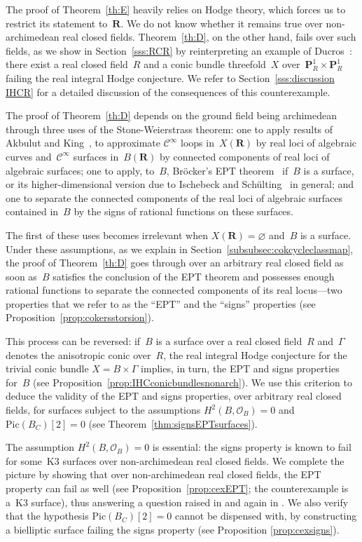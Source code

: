 \documentclass[JEP,XML,SOM,Unicode]{cedram}
\theoremstyle{plain}
\theoremstyle{definition}
\numberwithin{equation}{section}
\newcommand{\sO}{{\mathscr O}}
\renewcommand{\P}{{\mathbf P}}
\newcommand{\R}{{\mathbf R}}
\newcommand{\Pic}{\mathrm{Pic}}
\renewcommand{\emptyset}{\varnothing}
\newcommand{\ci}{\mathscr{C}^{\infty}}
\begin{document}
{The proof of Theorem~\ref{th:E} heavily relies on Hodge theory, which forces us to restrict
its statement to~$\R$.
We do not know whether it remains true over non-archimedean real closed fields.
Theorem~\ref{th:D}, on the other hand, fails over such fields,
as we show in Section~\ref{sss:RCR}
by reinterpreting an example of Ducros~\cite{ducros}:
there exist a real closed field~$R$ and a conic bundle threefold~$X$
over~$\P^1_R \times \P^1_R$ failing the real integral Hodge conjecture.
We refer to Section~\ref{sss:discussion IHCR}
for a detailed discussion of the consequences of this counterexample.

The proof of Theorem~\ref{th:D} depends on the ground field being archimedean
through three uses of the Stone-Weierstrass theorem:
one to apply results of Akbulut and King~\cite{AKhomology}, \cite{AkbulutKing}
to approximate $\ci$ loops in~$X(\R)$ by real loci of algebraic curves and~$\ci$ surfaces
in~$B(\R)$
by connected components of real loci of algebraic surfaces; one to apply, to~$B$,
Bröcker's
EPT theorem~\cite{brocker} if~$B$ is a surface,
or its higher-dimensional version due to Ischebeck and Schülting~\cite{IS} in general;
and one to separate the connected components of the real loci of algebraic
surfaces contained in~$B$ by the signs of rational functions on these surfaces.

The first of these uses becomes irrelevant when $X(\R)=\emptyset$ and~$B$
is a surface.
Under these assumptions,
as we explain in Section~\ref{subsubsec:cokcycleclassmap},
the proof of Theorem~\ref{th:D} goes through over an arbitrary real closed field
as soon as~$B$ satisfies the conclusion of the EPT theorem
and possesses enough rational functions to separate the connected components of its real locus---two
properties that we refer to as the ``EPT'' and the ``signs'' properties
(see Proposition~\ref{prop:cokersstorsion}).

This process can be reversed: if~$B$ is a surface over a real closed field~$R$
and~$\Gamma$ denotes the anisotropic conic over~$R$, the real integral Hodge conjecture
for the trivial conic bundle $X = B \times \Gamma$ implies, in turn, the EPT and signs
properties for~$B$ (see Proposition~\ref{prop:IHCconicbundlesnonarch}).
We use this criterion to deduce the validity of the EPT and signs properties,
over arbitrary real closed fields,
for surfaces
subject to the assumptions $H^2(B,\sO_B)=0$ and $\Pic(B_C)[2]=0$
(see Theorem~\ref{thm:signsEPTsurfaces}).

The assumption $H^2(B,\sO_B)=0$ is essential:
the signs property is known to fail
for some~K3 surfaces over non-archimedean real closed fields.
We complete the picture by showing that over non-archimedean real closed fields,
the EPT property can fail as well
(see Proposition~\ref{prop:cexEPT}; the counterexample is a~K3 surface),
thus answering a question raised in \cite{IS} and again in \cite{scheidererpurity}. We also verify that the hypothesis $\Pic(B_C)[2]=0$ cannot be dispensed with, by constructing a bielliptic surface failing the signs property (see Proposition \ref{prop:cexsigns}).

}
\end{document}
